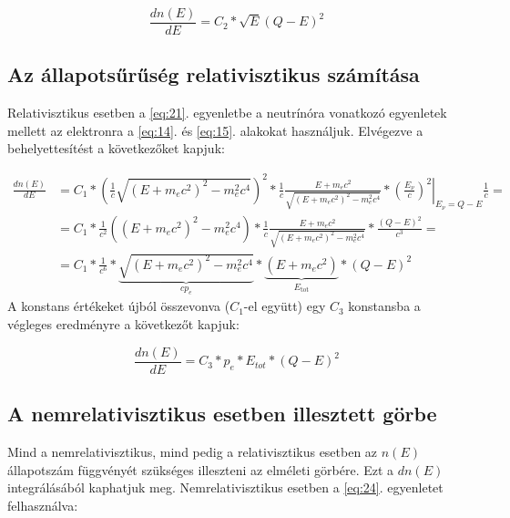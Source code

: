 \begin{equation} \label{eq:24}
\boxed{
\frac{dn \left( E \right)}{dE}
=
C_{2} * \sqrt{E} \left( Q - E \right)^{2}
}
\end{equation}

\subsection{Az állapotsűrűség relativisztikus számítása}
Relativisztikus esetben a \ref{eq:21}. egyenletbe a neutrínóra vonatkozó egyenletek mellett az elektronra a \ref{eq:14}. és \ref{eq:15}. alakokat használjuk. Elvégezve a behelyettesítést a következőket kapjuk:

\begin{align} \label{eq:25}
\frac{dn \left( E \right)}{dE}
&=
C_{1} * \left( \frac{1}{c} \sqrt{\left( E + m_{e} c^2 \right)^2 - m_{e}^{2} c^{4}} \right)^{2}
*
\frac{1}{c} \frac{E + m_{e} c^2}{\sqrt{\left( E + m_{e} c^2 \right)^2 - m_{e}^{2} c^{4}}}
*
\left. \left( \frac{E_{\nu}}{c} \right)^{2} \right|_{E_{\nu} = Q - E} \frac{1}{c}
= \nonumber \\
&=
C_{1} * \frac{1}{c^{2}} \left( \left( E + m_{e} c^2 \right)^2 - m_{e}^{2} c^{4} \right)
*
\frac{1}{c} \frac{E + m_{e} c^2}{\sqrt{\left( E + m_{e} c^2 \right)^2 - m_{e}^{2} c^{4}}}
*
\frac{\left( Q - E \right)^{2}}{c^{3}}
= \nonumber \\
&=
C_{1} * \frac{1}{c^{6}}
*
\underbrace{\sqrt{\left( E + m_{e} c^{2} \right)^{2} - m_{e}^{2} c^{4}}}_{c p_{e}}
*
\underbrace{\left( E + m_{e} c^{2} \right)}_{E_{\text{tot}}}
*
\left( Q - E \right)^{2}
\end{align}
A konstans értékeket újból összevonva ($C_{1}$-el együtt) egy $C_{3}$ konstansba a végleges eredményre a következőt kapjuk:

\begin{equation} \label{eq:26}
\boxed{
\frac{dn \left( E \right)}{dE}
=
C_{3} * p_{e} * E_{tot} * \left( Q - E \right)^{2}
}
\end{equation}

\subsection{A nemrelativisztikus esetben illesztett görbe}
Mind a nemrelativisztikus, mind pedig a relativisztikus esetben az $n \left( E \right)$ állapotszám függvényét szükséges illeszteni az elméleti görbére. Ezt a $dn \left( E \right)$ integrálásából kaphatjuk meg. Nemrelativisztikus esetben a \ref{eq:24}. egyenletet felhasználva:

